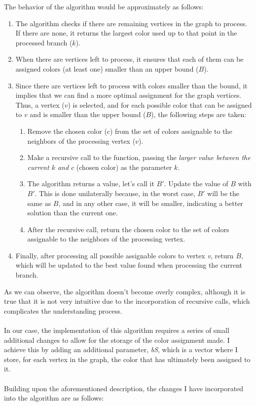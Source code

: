 \documentclass[british,a4paper,11pt,titlepage]{article}
\begin{document}
The behavior of the algorithm would be approximately as follows:
\begin{enumerate}
    \item The algorithm checks if there are remaining vertices in the graph to process. If there are none, it returns the largest color used up to that point in the processed branch ($k$).
    \item When there are vertices left to process, it ensures that each of them can be assigned colors (at least one) smaller than an upper bound ($B$).
    \item Since there are vertices left to process with colors smaller than the bound, it implies that we can find a more optimal assignment for the graph vertices. Thus, a vertex ($v$) is selected, and for each possible color that can be assigned to $v$ and is smaller than the upper bound ($B$), the following steps are taken:
    \begin{enumerate}
    \item Remove the chosen color ($c$) from the set of colors assignable to the neighbors of the processing vertex ($v$).
    \item Make a recursive call to the function, passing the \emph{larger value between the current $k$ and $c$} (chosen color) as the parameter $k$.
    \item The algorithm returns a value, let's call it $B'$. Update the value of $B$ with $B'$. This is done unilaterally because, in the worst case, $B'$ will be the same as $B$, and in any other case, it will be smaller, indicating a better solution than the current one.
    \item After the recursive call, return the chosen color to the set of colors assignable to the neighbors of the processing vertex.
    \end{enumerate}
    \item Finally, after processing all possible assignable colors to vertex 
    \emph{v}, return $B$, which will be updated to the best value found when processing the current branch.
\end{enumerate}

As we can observe, the algorithm doesn't become overly complex, although it is true that it is not very intuitive due to the incorporation of recursive calls, which complicates the understanding process.
\\
\\
In our case, the implementation of this algorithm requires a series of small additional changes to allow for the storage of the color assignment made. I achieve this by adding an additional parameter, \emph{bS}, which is a vector where I store, for each vertex in the graph, the color that has ultimately been assigned to it. 
\\
\\
Building upon the aforementioned description, the changes I have incorporated into the algorithm are as follows:
\end{document}
